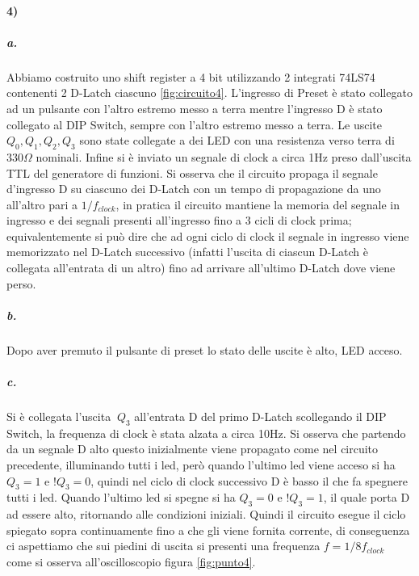 \documentclass{article}
\begin{document}
	\paragraph{4)}
	\subparagraph{a.} Abbiamo costruito uno shift register a 4 bit utilizzando 2 integrati 74LS74 contenenti 2 D-Latch ciascuno \ref{fig:circuito4}. L'ingresso di Preset è stato collegato ad un pulsante con l'altro estremo messo a terra mentre l'ingresso D è stato collegato al DIP Switch, sempre con l'altro estremo messo a terra. Le uscite $Q_0,Q_1,Q_2,Q_3$ sono state collegate a dei LED con una resistenza verso terra di $330\Omega$ nominali. Infine si è inviato un segnale di clock a circa 1Hz preso dall'uscita TTL del generatore di funzioni. Si osserva che il circuito propaga il segnale d'ingresso D su ciascuno dei D-Latch con un tempo di propagazione da uno all'altro pari a $1/f_{clock}$, in pratica il circuito mantiene la memoria del segnale in ingresso e dei segnali presenti all'ingresso fino a 3 cicli di clock prima; equivalentemente si può dire che ad ogni ciclo di clock il segnale in ingresso viene memorizzato nel D-Latch successivo (infatti l'uscita di ciascun D-Latch è collegata all'entrata di un altro) fino ad arrivare all'ultimo D-Latch dove viene perso.
	\subparagraph{b.} Dopo aver premuto il pulsante di preset lo stato delle uscite è alto, LED acceso.
	\subparagraph{c.} Si è collegata l'uscita $\ Q_{3}$ all'entrata D del primo D-Latch scollegando il DIP Switch, la frequenza di clock è stata alzata a circa 10Hz. Si osserva che partendo da un segnale D alto questo inizialmente viene propagato come nel circuito precedente, illuminando tutti i led, però quando l'ultimo led viene acceso si ha $Q_{3}=1$ e $!Q_{3}=0$, quindi nel ciclo di clock successivo D è basso il che fa spegnere tutti i led. Quando l'ultimo led si spegne si ha $Q_{3}=0$ e $!Q_{3}=1$, il quale porta D ad essere alto, ritornando alle condizioni iniziali. Quindi il circuito esegue il ciclo spiegato sopra continuamente fino a che gli viene fornita corrente, di conseguenza ci aspettiamo che sui piedini di uscita si presenti una frequenza $f=1/8f_{clock}$ come si osserva all'oscilloscopio figura \ref{fig:punto4}.
	
\end{document}
